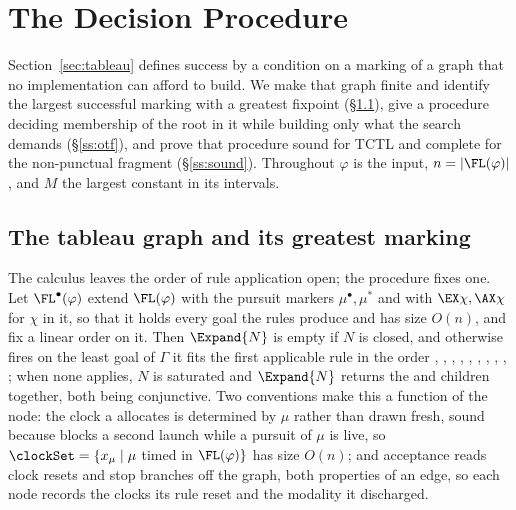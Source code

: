 
\section{The Decision Procedure}\label{sec:correct}

Section~\ref{sec:tableau} defines success by a condition on a marking of a graph that no
implementation can afford to build. We make that graph finite and identify the largest successful
marking with a greatest fixpoint (\S\ref{ss:gfp}), give a procedure deciding membership of the root
in it while building only what the search demands (\S\ref{ss:otf}), and prove that procedure sound
for TCTL and complete for the non-punctual fragment (\S\ref{ss:sound}). Throughout $\varphi$ is the
input, $n=|\FL(\varphi)|$, and $M$ the largest constant in its intervals. 

\subsection{The tableau graph and its greatest marking}\label{ss:gfp}

The calculus leaves the order of rule application open; the procedure fixes one. Let
$\FL^{\bullet}(\varphi)$ extend $\FL(\varphi)$ with the pursuit markers $\mu^\bullet,\mu^{\ast}$ and
with $\EX\chi,\AX\chi$ for $\chi$ in it, so that it holds every goal the rules produce and has size
$O(n)$, and fix a linear order on it. Then $\Expand{N}$ is empty if $N$ is closed, and otherwise
fires on the least goal of $\Gamma$ it fits the first applicable rule in the order ,
, , , , ,
, , , ; when none applies, $N$
is saturated and $\Expand{N}$ returns the  and  children together, both
being conjunctive. Two conventions make this a function of the node: the clock a 
allocates is determined by $\mu$ rather than drawn fresh, sound because  blocks a second
launch while a pursuit of $\mu$ is live, so $\clockSet=\{x_\mu\mid\mu$ timed in $\FL(\varphi)\}$ has
size $O(n)$; and acceptance reads clock resets and stop branches off the graph, both properties of an
edge, so each node records the clocks its rule reset and the modality it discharged.

